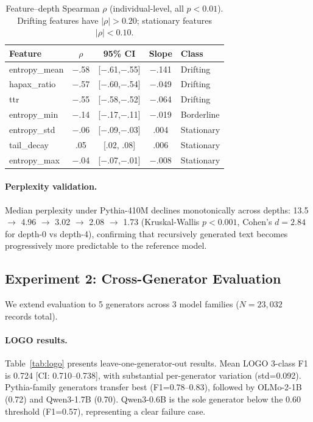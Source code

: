 \documentclass[11pt,a4paper]{article}
\begin{document}
\begin{table}[t]
\centering
\small
\begin{tabular}{lcccl}
\toprule
Feature & $\rho$ & 95\% CI & Slope & Class \\
\midrule
entropy\_mean & $-$.58 & [$-$.61,$-$.55] & $-$.141 & Drifting \\
hapax\_ratio & $-$.57 & [$-$.60,$-$.54] & $-$.049 & Drifting \\
ttr & $-$.55 & [$-$.58,$-$.52] & $-$.064 & Drifting \\
entropy\_min & $-$.14 & [$-$.17,$-$.11] & $-$.019 & Borderline \\
entropy\_std & $-$.06 & [$-$.09,$-$.03] & .004 & Stationary \\
tail\_decay & .05 & [.02, .08] & .006 & Stationary \\
entropy\_max & $-$.04 & [$-$.07,$-$.01] & $-$.008 & Stationary \\
\bottomrule
\end{tabular}
\caption{Feature--depth Spearman $\rho$ (individual-level, all $p{<}0.01$). Drifting features have $|\rho|{>}0.20$; stationary features $|\rho|{<}0.10$.}
\label{tab:trends}
\end{table}

\paragraph{Perplexity validation.} Median perplexity under Pythia-410M declines monotonically across depths: 13.5 $\to$ 4.96 $\to$ 3.02 $\to$ 2.08 $\to$ 1.73 (Kruskal-Wallis $p{<}0.001$, Cohen's $d{=}2.84$ for depth-0 vs depth-4), confirming that recursively generated text becomes progressively more predictable to the reference model.

\subsection{Experiment 2: Cross-Generator Evaluation}
\label{sec:exp2}

We extend evaluation to 5 generators across 3 model families ($N{=}23{,}032$ records total).

\paragraph{LOGO results.} Table~\ref{tab:logo} presents leave-one-generator-out results. Mean LOGO 3-class F1 is 0.724 [CI: 0.710--0.738], with substantial per-generator variation (std=0.092). Pythia-family generators transfer best (F1=0.78--0.83), followed by OLMo-2-1B (0.72) and Qwen3-1.7B (0.70). Qwen3-0.6B is the sole generator below the 0.60 threshold (F1=0.57), representing a clear failure case.
\end{document}
